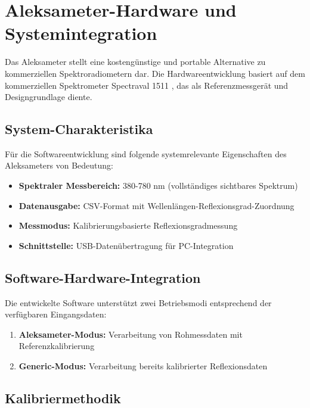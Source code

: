 \section{Aleksameter-Hardware und Systemintegration}

Das Aleksameter stellt eine kostengünstige und portable Alternative zu kommerziellen Spektroradiometern dar. Die Hardwareentwicklung basiert auf dem kommerziellen Spektrometer Spectraval 1511 \parencite{Piotrowska2022}, das als Referenzmessgerät und Designgrundlage diente.

\subsection{System-Charakteristika}

Für die Softwareentwicklung sind folgende systemrelevante Eigenschaften des Aleksameters von Bedeutung:

\begin{itemize}
    \item \textbf{Spektraler Messbereich:} 380-780 nm (vollständiges sichtbares Spektrum)
    \item \textbf{Datenausgabe:} CSV-Format mit Wellenlängen-Reflexionsgrad-Zuordnung
    \item \textbf{Messmodus:} Kalibrierungsbasierte Reflexionsgradmessung
    \item \textbf{Schnittstelle:} USB-Datenübertragung für PC-Integration
\end{itemize}

\subsection{Software-Hardware-Integration}

Die entwickelte Software unterstützt zwei Betriebsmodi entsprechend der verfügbaren Eingangsdaten:

\begin{enumerate}
    \item \textbf{Aleksameter-Modus:} Verarbeitung von Rohmessdaten mit Referenzkalibrierung
    \item \textbf{Generic-Modus:} Verarbeitung bereits kalibrierter Reflexionsdaten
\end{enumerate}

\subsection{Kalibriermethodik}

